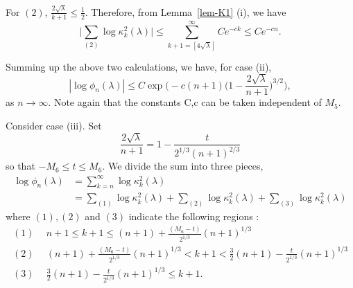 \documentclass{amsart}
\theoremstyle{definition}
\theoremstyle{remark}
\numberwithin{equation}{section}
\begin{document}
For $(2)$, $\frac{2\sqrt{\lambda}}{k+1}\le \frac12$.
Therefore, from Lemma~\ref{lem-K1} (i), we have
\begin{equation*}
   \bigl|\sum_{(2)} \log{\kappa^2_k}(\lambda)\bigr|
   \le \sum_{k+1=[4\sqrt{\lambda}]}^{\infty} Ce^{-ck} \le Ce^{-cn}.
\end{equation*}

Summing up the above two calculations, we have, for case (ii), 
\begin{equation}\label{e-z35}
   |\log{\phi_n(\lambda)}| \le C\exp\biggl(-c(n+1)
\bigl(1-\frac{2\sqrt{\lambda}}{n+1}\bigr)^{3/2}\biggr),
\end{equation}
as $n\to\infty$.
Note again that the constants C,c can be taken independent of $M_5$.
 


 
\bigskip
Consider case (iii).
Set 
\begin{equation}\label{e-z38}
   \frac{2\sqrt{\lambda}}{n+1}=1-\frac{t}{2^{1/3}{(n+1)}^{2/3}}
\end{equation}
so that $-M_6\le t\le M_6$. 
We divide the sum into three pieces,  
\begin{equation*}
  \begin{split}
     \log{\phi_n(\lambda)}
     &=\sum_{k=n}^{\infty} \log{\kappa^2_k}(\lambda)\\
     &=\sum_{(1)} \log{\kappa^2_{k}}(\lambda) 
     + \sum_{(2)} \log{\kappa^2_{k}}(\lambda) 
     + \sum_{(3)} \log{\kappa^2_{k}}(\lambda)
  \end{split}
\end{equation*}
where $(1),(2)$ and $(3)$ indicate the following regions :
\begin{align*}
  (1)\ \  &n+1\le k+1 \le (n+1)+\frac{(M_6-t)}{2^{1/3}}{(n+1)}^{1/3}\\
  (2)\ \  &(n+1)+\frac{(M_6-t)}{2^{1/3}}{(n+1)}^{1/3} <k+1 
< \frac32(n+1)-\frac{t}{2^{1/3}}(n+1)^{1/3}\\
  (3)\ \  &\frac32(n+1)-\frac{t}{2^{1/3}}(n+1)^{1/3} \le k+1.
\end{align*}
\end{document}
